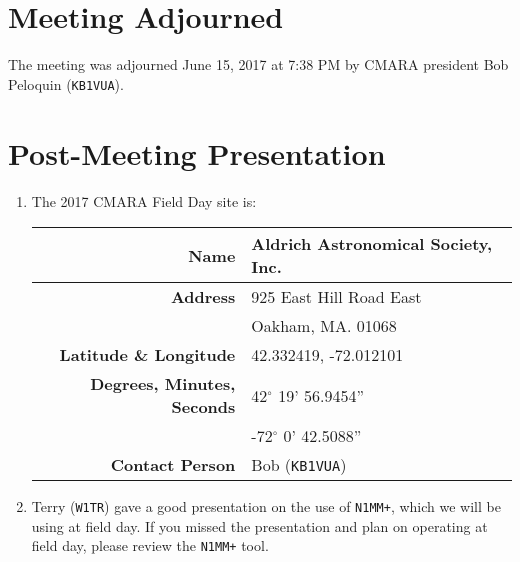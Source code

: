 \documentclass[10pt,letterpaper]{article}
\begin{document}
\section{Meeting Adjourned}
The meeting was adjourned June 15, 2017 at 7:38 PM by CMARA president Bob Peloquin (\texttt{KB1VUA}).

\section{Post-Meeting Presentation}
\begin{enumerate}
  \item The 2017 CMARA Field Day site is:\\
  \begin{tabular}{|rl|}
    \hline
    \textbf{Name} & Aldrich Astronomical Society, Inc. \\ \hline
    \textbf{Address} & 925 East Hill Road East\\
    &  Oakham, MA. 01068 \\ \hline
    \textbf{Latitude \& Longitude} & 42.332419, -72.012101 \\ \hline
    \textbf{Degrees, Minutes, Seconds} & 42$^{\circ}$ 19' 56.9454'' \\
    & -72$^{\circ}$ 0' 42.5088'' \\ \hline
    \textbf{Contact Person} & Bob (\texttt{KB1VUA}) \\ \hline
  \end{tabular}
  \item Terry (\texttt{W1TR}) gave a good presentation on the use of \texttt{N1MM+}, which we will be using at field day. If you missed the presentation and plan on operating at field day, please review the \texttt{N1MM+} tool.
\end{enumerate}
\end{document}
